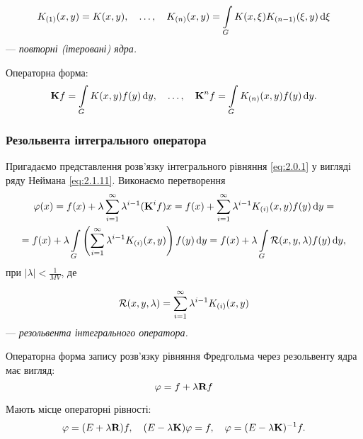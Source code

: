 \begin{definition}
	\begin{equation}
		\label{eq:2.1.16}
		K_{(1)}(x, y) = K(x, y), \quad \ldots, \quad K_{(n)}(x, y) = \Int_G K(x, \xi) K_{(n - 1)}(\xi, y) \diff \xi
	\end{equation}
	--- \it{повторні (ітеровані) ядра}.
\end{definition}

Операторна форма:
\begin{equation}
	\label{eq:2.1.17}
	\bf{K}f = \Int_G K(x, y) f(y) \diff y, \quad \ldots, \quad \bf{K}^n f = \Int_G K_{(n)}(x, y)f(y) \diff y.
\end{equation}

\subsubsection{Резольвента інтегрального оператора}

Пригадаємо представлення розв'язку інтегрального рівняння \ref{eq:2.0.1} у вигляді ряду Неймана \eqref{eq:2.1.11}. Виконаємо перетворення
\begin{multline*}
	\varphi(x) = f(x) + \lambda \displaystyle\sum\limits_{i = 1}^\infty \lambda^{i - 1} (\textbf{K}^i f) x = f(x) + \displaystyle\sum\limits_{i = 1}^\infty \lambda^{i - 1} K_{(i)} (x, y) f(y) \mathop{}\!\mathrm{d} y = \\
	= f(x) + \lambda \displaystyle\int\limits_G \left( \displaystyle\sum\limits_{i = 1}^\infty \lambda^{i - 1} K_{(i)} (x, y) \right) f(y) \mathop{}\!\mathrm{d} y = f(x) + \lambda \displaystyle\int\limits_G \mathcal{R}(x, y, \lambda) f(y) \mathop{}\!\mathrm{d} y,
\end{multline*}
при $|\lambda| < \frac{1}{MV}$, де

\begin{definition}
	\begin{equation}
		\label{eq:2.1.18}
		\cal{R}(x, y, \lambda) = \Sum_{i = 1}^\infty \lambda^{i - 1} K_{(i)} (x, y)
	\end{equation}
	--- \it{резольвента інтегрального оператора}.
\end{definition}

Операторна форма запису розв'язку рівняння Фредгольма через резольвенту ядра має вигляд:
\begin{equation}
	\label{eq:2.1.19}
	\phi = f + \lambda \bf{R} f
\end{equation}

\begin{proposition}
	Мають місце операторні рівності:
	\begin{equation}
		\label{eq:2.1.20}
		\phi = (E + \lambda \bf{R})f, \quad (E - \lambda \bf{K})\phi = f,\quad \phi = (E - \lambda \bf{K})^{-1}f.
	\end{equation}
\end{proposition}

